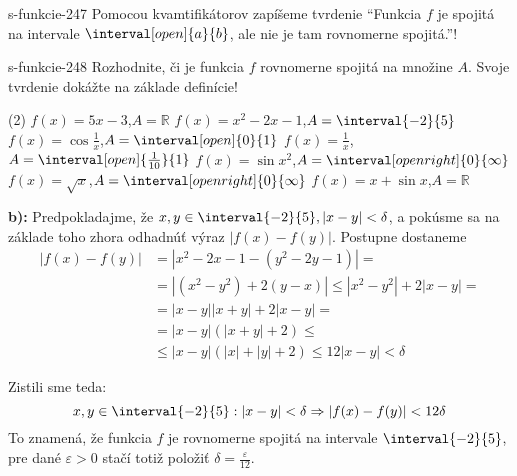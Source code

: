 \begin{defproblem}{s-funkcie-247}
Pomocou kvamtifikátorov zapíšeme tvrdenie \enquote{Funkcia $f$ je spojitá na intervale
$\interval[open]{a}{b}$, ale nie je tam rovnomerne spojitá.}!
\end{defproblem}

\begin{defproblem}{s-funkcie-248}
Rozhodnite, či je funkcia $f$ rovnomerne spojitá na množine $A$. Svoje tvrdenie
dokážte na základe definície!
\begin{tasks}(2)
\task $f(x)=5x-3$,$A=\mathbb{R}$
\task $f(x)=x^2-2x-1$,$A= \interval{-2}{5}$
\task $f(x)=\cos \frac{1}{x}$,$A=\interval[open]{0}{1}$
\task $f(x)=\frac{1}{x}$,$A=\interval[open]{\frac{1}{10}}{1}$
\task $f(x)=\sin x^2$,$A=\interval[open right]{0}{\infty}$
\task $f(x)=\sqrt{x}$,$A=\interval[open right]{0}{\infty}$
\task $f(x)=x+\sin x$,$A=\mathbb{R}$
\end{tasks}

\begin{solution}
  \textbf{b):}
  Predpokladajme, že $x,y \in \interval{-2}{5}, |x-y|<\delta$, a pokúsme sa na
  základe toho zhora odhadnúť výraz $|f(x)-f(y)|$. Postupne dostaneme
  \begin{align*}
    |f(x)-f(y)|&=|x^2-2x-1-(y^2-2y-1)| = \\
       &= |(x^2-y^2)+2(y-x)|\leq
    |x^2-y^2|+2|x-y|=  \\
    &=|x-y||x+y|+2|x-y| = \\
    &=|x-y|(|x+y|+2)\leq  \\
    & \leq|x-y|(|x|+|y|+2)\leq 12|x-y|<\delta
  \end{align*}

  Zistili sme teda:
  \[
    x,y \in \interval{-2}{5}:
    |x-y|<\delta
    \Rightarrow
    |f(x)-f(y)|<12\delta
  \]
  To znamená, že funkcia $f$ je rovnomerne spojitá na
  intervale $\interval{-2}{5}$, pre dané $\varepsilon > 0$ stačí totiž
  položiť $\delta = \frac{\varepsilon}{12}$.


\end{solution}
\end{defproblem}
